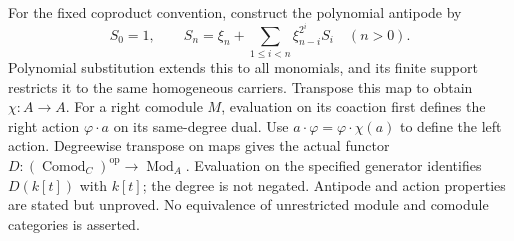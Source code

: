 \begin{definition}
  \label{def:milnor-contravariant-dualization}
  \notready
  For the fixed coproduct convention, construct the polynomial antipode by
  \[
    S_0=1,\qquad
    S_n=\xi_n+\sum_{1\leq i<n}\xi_{n-i}^{2^i}S_i\quad(n>0).
  \]
  Polynomial substitution extends this to all monomials, and its finite
  support restricts it to the same homogeneous carriers. Transpose this
  map to obtain $\chi:A\to A$. For a right comodule $M$, evaluation on
  its coaction first defines the right action $\varphi\cdot a$ on its
  same-degree dual. Use $a\cdot\varphi=\varphi\cdot\chi(a)$ to define
  the left action. Degreewise transpose on maps gives the actual functor
  $D:(\operatorname{Comod}_C)^{\mathrm{op}}\to\operatorname{Mod}_A$.
  Evaluation on the specified generator identifies $D(k[t])$ with $k[t]$;
  the degree is not negated. Antipode and action properties are stated but
  unproved. No equivalence of unrestricted module and comodule categories
  is asserted.
\end{definition}

